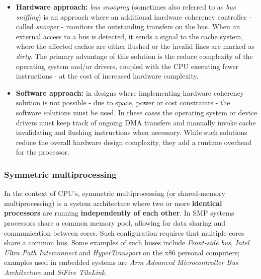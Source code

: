 \begin{itemize}
	\item \textbf{Hardware approach:} \textit{bus snooping} (sometimes also referred to as \textit{bus sniffing}) is an %
		approach where an additional hardware coherency controller - called \textit{snooper} - monitors the outstanding
		transfers on the bus. When an external access to a bus is detected, it sends a signal to the cache system, where the
		affected caches are either flushed or the invalid lines are marked as \textit{dirty}. The primary advantage of this solution is the reduce
		complexity of the operating system and/or drivers, coupled with the CPU executing fewer instructions - at the cost of increased hardware complexity. %
	\item \textbf{Software approach:} in designs where implementing hardware coherency solution is not possible - due to space, power or cost constraints -
		the software solutions must be used. In these cases the operating system or device drivers must keep track of ongoing DMA transfers and manually
		invoke cache invalidating and flushing instructions when necessary. While such solutions reduce the overall hardware design complexity, they add a
		runtime overhead for the processor.
\end{itemize}


\subsubsection{Symmetric multiprocessing}

In the context of CPU's, symmetric multiprocessing (or shared-memory multiprocessing) is a system architecture where two or more \textbf{identical processors} %
are running \textbf{independently of each other}. In SMP systems processors share a common memory pool, allowing for data sharing and communication
between cores. Such configuration requires that multiple cores share a common bus. Some examples of such buses include \textit{Front-side bus}, \textit{Intel Ultra Path Interconnect} %
and \textit{HyperTransport} on the x86 personal computers; examples used in embedded systems are \textit{Arm Advanced Microcontroller Bus Architecture} and \textit{SiFive TileLink}. %

